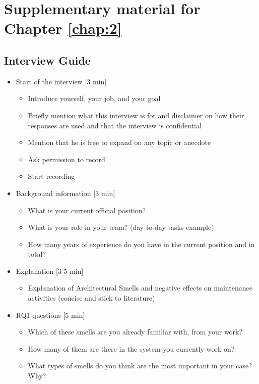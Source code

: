 \chapter{Supplementary material for Chapter \ref{chap:2}}\label{c2:appendix}
\section{Interview Guide}
\begin{itemize}
    \item Start of the interview [3 min]
    \begin{itemize}
        \item Introduce yourself, your job, and your goal
        \item Briefly mention what this interview is for and disclaimer on how their responses are used and that the interview is confidential
        \item Mention that he is free to expand on any topic or anecdote
        \item Ask permission to record 
        \item Start recording
    \end{itemize}

    \item Background information [3 min]
    \begin{itemize}
        \item What is your current official position? 
        \item What is your role in your team? (day-to-day tasks example) 
        \item How many years of experience do you have in the current position and in total? 
    \end{itemize}

    \item Explanation [3-5 min]
    \begin{itemize}
        \item Explanation of Architectural Smells and negative effects on maintenance activities (concise and stick to literature) 
    \end{itemize}

    \item RQ1 questions [5 min]
    \begin{itemize}
        \item Which of these smells are you already familiar with, from your work? 
        \item How many of them are there in the system you currently work on?
        \item What types of smells do you think are the most important in your case? Why? 
    \end{itemize}


\end{itemize}

